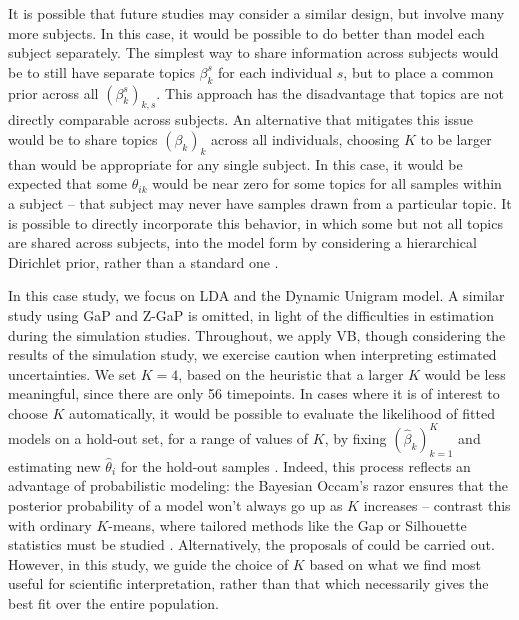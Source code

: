 \documentclass[oupdraft]{bio}
\begin{document}
It is possible that future studies may consider a similar design, but involve
many more subjects. In this case, it would be possible to do better than model
each subject separately. The simplest way to share information across subjects
would be to still have separate topics $\beta_{k}^{s}$ for each individual $s$,
but to place a common prior across all $\left(\beta_{k}^{s}\right)_{k, s}$. This
approach has the disadvantage that topics are not directly comparable across
subjects. An alternative that mitigates this issue would be to share topics
$\left(\beta_{k}\right)_{k}$ across all individuals, choosing $K$ to be larger
than would be appropriate for any single subject. In this case, it would be
expected that some $\theta_{ik}$ would be near zero for some topics for all
samples within a subject -- that subject may never have samples drawn from a
particular topic. It is possible to directly incorporate this behavior, in which
some but not all topics are shared across subjects, into the model form by
considering a hierarchical Dirichlet prior, rather than a standard one
\citep{wallach2006topic, teh2005sharing}.

In this case study, we focus on LDA and the Dynamic Unigram model. A similar
study using GaP and Z-GaP is omitted, in light of the difficulties in estimation
during the simulation studies. Throughout, we apply VB, though considering the
results of the simulation study, we exercise caution when interpreting estimated
uncertainties. We set $K = 4$, based on the heuristic that a larger $K$ would be
less meaningful, since there are only 56 timepoints. In cases where it is of
interest to choose $K$ automatically, it would be possible to evaluate the
likelihood of fitted models on a hold-out set, for a range of values of $K$, by
fixing $\left(\hat{\beta}_{k}\right)_{k = 1}^{K}$ and estimating new
$\hat{\theta}_{i}$ for the hold-out samples \citep{blei2003latent}. Indeed, this
process reflects an advantage of probabilistic modeling: the Bayesian Occam's
razor ensures that the posterior probability of a model won't always go up as
$K$ increases -- contrast this with ordinary $K$-means, where tailored methods
like the Gap or Silhouette statistics must be studied
\citep{rasmussen2001occam, tibshirani2001estimating, kaufman2009finding}.
Alternatively, the proposals of \citep{wallach2009evaluation} could be carried
out. However, in this study, we guide the choice of $K$ based on what we find
most useful for scientific interpretation, rather than that which necessarily
gives the best fit over the entire population.
\end{document}
